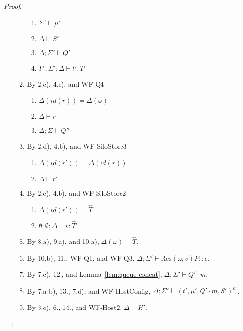 \documentclass{article}
\theoremstyle{definition}
\newcommand{\Res}[2]{\text{Res}(#1, #2)}
\begin{document}
\begin{proof}
\begin{itemize}
\begin{enumerate}
  \begin{enumerate}[label=(\alph*)]
  \item $\Sigma' \vdash \mu'$
  \item $\Delta \vdash S'$
  \item $\Delta ; \Sigma' \vdash Q'$
  \item $\Gamma' ; \Sigma' ; \Delta \vdash t' : T'$
  \end{enumerate}
\item By 2.c), 4.c), and WF-Q4
  \begin{enumerate}[label=(\alph*)]
  \item $\Delta(id(r)) = \Delta(\omega)$
  \item $\Delta \vdash r$
  \item $\Delta ; \Sigma \vdash Q''$
  \end{enumerate}
\item By 2.d), 4.b), and WF-SiloStore3
  \begin{enumerate}[label=(\alph*)]
  \item $\Delta(id(r')) = \Delta(id(r))$
  \item $\Delta \vdash r'$
  \end{enumerate}
\item By 2.e), 4.b), and WF-SiloStore2
  \begin{enumerate}[label=(\alph*)]
  \item $\Delta(id(r')) = \hat{T}$
  \item $\emptyset ; \emptyset ; \Delta \vdash v : \hat{T}$
  \end{enumerate}
\item By 8.a), 9.a), and 10.a), $\Delta(\omega) = \hat{T}$.
\item By 10.b), 11., WF-Q1, and WF-Q3, $\Delta ; \Sigma' \vdash {\Res \omega v P} :: \epsilon$.
\item By 7.c), 12., and Lemma~\ref{lem:queue-concat}, $\Delta ; \Sigma' \vdash Q' \cdot m$.
\item By 7.a-b), 13., 7.d), and WF-HostConfig, $\Delta ; \Sigma' \vdash (t', \mu', Q' \cdot m, S')^{h'}$.
\item By 3.c), 6., 14., and WF-Host2, $\Delta \vdash H'$.
\end{enumerate}


\end{itemize}
\end{proof}
\end{document}
